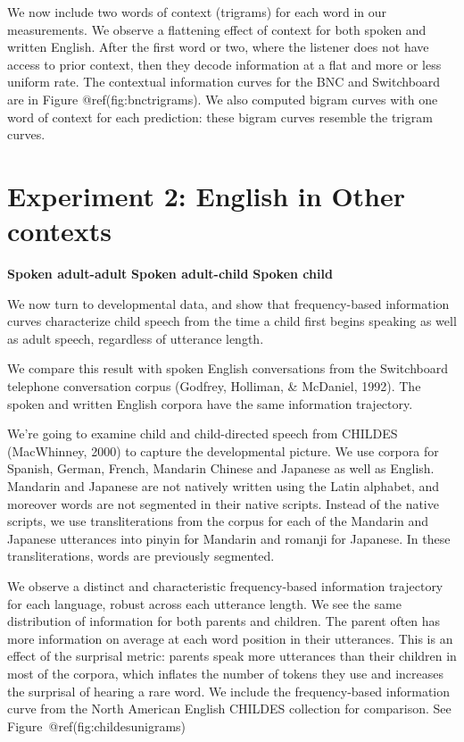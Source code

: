 \documentclass[10pt, letterpaper]{article}
\begin{document}
We now include two words of context (trigrams) for each word in our
measurements. We observe a flattening effect of context for both spoken
and written English. After the first word or two, where the listener
does not have access to prior context, then they decode information at a
flat and more or less uniform rate. The contextual information curves
for the BNC and Switchboard are in Figure @ref(fig:bnctrigrams). We also
computed bigram curves with one word of context for each prediction:
these bigram curves resemble the trigram curves.

\hypertarget{experiment-2-english-in-other-contexts}{%
\section{Experiment 2: English in Other
contexts}\label{experiment-2-english-in-other-contexts}}

\textbf{Spoken adult-adult} \textbf{Spoken adult-child} \textbf{Spoken
child}

We now turn to developmental data, and show that frequency-based
information curves characterize child speech from the time a child first
begins speaking as well as adult speech, regardless of utterance length.

We compare this result with spoken English conversations from the
Switchboard telephone conversation corpus (Godfrey, Holliman, \&
McDaniel, 1992). The spoken and written English corpora have the same
information trajectory.

We're going to examine child and child-directed speech from CHILDES
(MacWhinney, 2000) to capture the developmental picture. We use corpora
for Spanish, German, French, Mandarin Chinese and Japanese as well as
English. Mandarin and Japanese are not natively written using the Latin
alphabet, and moreover words are not segmented in their native scripts.
Instead of the native scripts, we use transliterations from the corpus
for each of the Mandarin and Japanese utterances into pinyin for
Mandarin and romanji for Japanese. In these transliterations, words are
previously segmented.

We observe a distinct and characteristic frequency-based information
trajectory for each language, robust across each utterance length. We
see the same distribution of information for both parents and children.
The parent often has more information on average at each word position
in their utterances. This is an effect of the surprisal metric: parents
speak more utterances than their children in most of the corpora, which
inflates the number of tokens they use and increases the surprisal of
hearing a rare word. We include the frequency-based information curve
from the North American English CHILDES collection for comparison. See
Figure~@ref(fig:childesunigrams)
\end{document}
